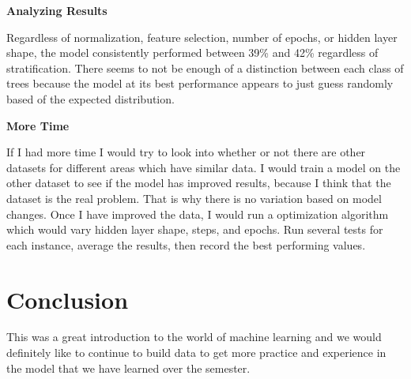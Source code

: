 \documentclass[conference]{IEEEtran}
\begin{document}
\noindent \textbf{Analyzing Results}

\noindent  Regardless of normalization, feature selection, number of epochs, or hidden layer shape, the model consistently performed between 39\% and 42\% regardless of stratification. There seems to not be enough of a distinction between each class of trees because the model at its best performance appears to just guess randomly based of the expected distribution. 

\noindent \textbf{More Time}

\noindent If I had more time I would try to look into whether or not there are other datasets for different areas which have similar data. I would train a model on the other dataset to see if the model has improved results, because I think that the dataset is the real problem. That is why there is no variation based on model changes. Once I have improved the data, I would run a optimization algorithm which would vary hidden layer shape, steps, and epochs. Run several tests for each instance, average the results, then record the best performing values.

\section{Conclusion}
This was a great introduction to the world of machine learning and we would definitely like to continue to build data to get more practice and experience in the model that we have learned over the semester.
\end{document}
